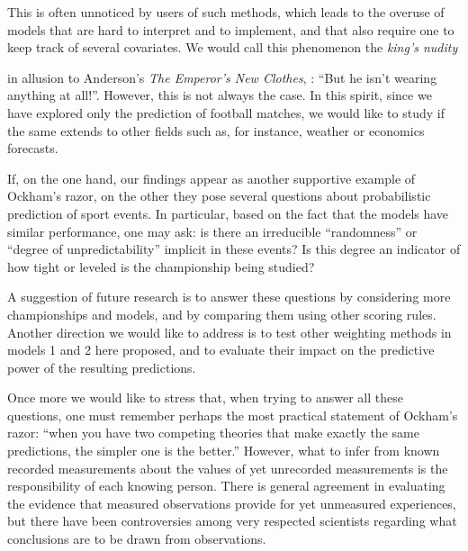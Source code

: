 \documentclass[journal,article,accept,moreauthors,pdftex,12pt,a4paper]{mdpi}
\begin{document}
    This is often unnoticed by users of such methods, which leads to the overuse of models that are
    hard to interpret and to implement, and that also require one to keep track of several covariates. We would call this phenomenon the {\it king's nudity} { in allusion to Anderson's {\it The Emperor's New Clothes}, \cite{emperor}: ``But he isn't wearing anything at all!''. However, this is not always the case. In this spirit, since we have explored only the prediction of football matches, we would like to study if the same extends to other fields such as, for instance, weather or economics forecasts.

    If, on the one hand, our findings appear as another supportive example of Ockham's razor, on the other they pose several questions about probabilistic prediction of sport events.
    In particular, based on the fact that the models have similar performance, one may ask: is there an irreducible ``randomness'' or ``degree of unpredictability'' implicit in these events?
    Is this degree an indicator of how tight or leveled is the championship being studied?

    A suggestion of future research is to answer these questions by considering more championships and models, and by comparing them using other scoring rules.
    Another direction we would like to address is to test other weighting methods in models 1 and 2 here
    proposed, and to evaluate their impact on the predictive power of the resulting predictions.

    Once more we would like to stress that, when trying to answer all these questions, one must remember perhaps the most practical statement of Ockham's razor: ``when you have two competing theories that make exactly the same predictions, the simpler one is the better.''
    However, what to infer from known recorded measurements about the values of yet unrecorded measurements is the responsibility of each knowing person.
    There is general agreement in evaluating the evidence that measured observations provide for yet unmeasured experiences, but there have been controversies among very respected scientists regarding what conclusions are to be drawn from observations.






}
\end{document}
